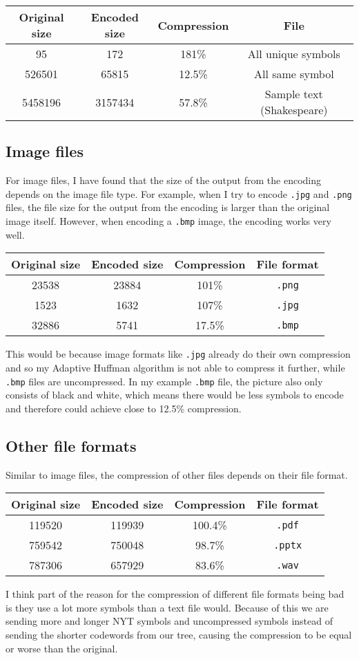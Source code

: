 \documentclass{article}
\newcommand{\tablerow}[4]{ #1 & #2 & #3 & #4\\}
\begin{document}
\begin{center}
\begin{tabular}{ |c|c|c|c| }
\hline
Original size & Encoded size & Compression & File \\
\hline
\tablerow{95}{172}{181\%}{All unique symbols}
\tablerow{526501}{65815}{12.5\%}{All same symbol}
\tablerow{5458196}{3157434}{57.8\%}{Sample text (Shakespeare)}
\hline
\end{tabular}
\end{center}

\subsection{Image files}
For image files, I have found that the size of the output from the encoding depends on the image file type. For example, when I try to encode \texttt{.jpg} and \texttt{.png} files, the file size for the output from the encoding is larger than the original image itself. However, when encoding a \texttt{.bmp} image, the encoding works very well.

\begin{center}
\begin{tabular}{ |c|c|c|c| }
\hline
Original size & Encoded size & Compression & File format \\
\hline
\tablerow{23538}{23884}{101\%}{\texttt{.png}}
\tablerow{1523}{1632}{107\%}{\texttt{.jpg}}
\tablerow{32886}{5741}{17.5\%}{\texttt{.bmp}}
\hline
\end{tabular}
\end{center}
This would be because image formats like \texttt{.jpg} already do their own compression and so my Adaptive Huffman algorithm is not able to compress it further, while \texttt{.bmp} files are uncompressed. In my example \texttt{.bmp} file, the picture also only consists of black and white, which means there would be less symbols to encode and therefore could achieve close to 12.5\% compression. 

\subsection{Other file formats}
Similar to image files, the compression of other files depends on their file format. 
\begin{center}
\begin{tabular}{ |c|c|c|c| }
\hline
Original size & Encoded size & Compression & File format \\
\hline
\tablerow{119520}{119939}{100.4\%}{\texttt{.pdf}}
\tablerow{759542}{750048}{98.7\%}{\texttt{.pptx}}
\tablerow{787306}{657929}{83.6\%}{\texttt{.wav}}
\hline
\end{tabular}
\end{center}
I think part of the reason for the compression of different file formats being bad is they use a lot more symbols than a text file would. Because of this we are sending more and longer NYT symbols and uncompressed symbols instead of sending the shorter codewords from our tree, causing the compression to be equal or worse than the original. 
\end{document}
